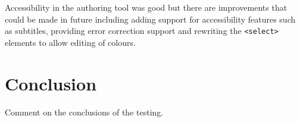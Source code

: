 Accessibility in the authoring tool was good but there are improvements that could be made in future including adding support for accessibility features such as subtitles, providing error correction support and rewriting the \texttt{\textless select\textgreater} elements to allow editing of colours.


\section{Conclusion}

Comment on the conclusions of the testing.

